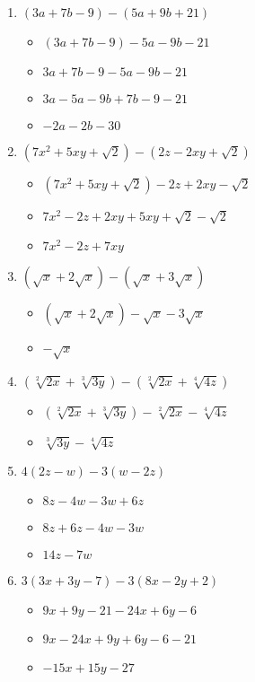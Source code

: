 \documentclass{article}
\begin{document}
\begin{onehalfspace}
\begin{enumerate}
    \item $(3a + 7b - 9) - (5a + 9b + 21)$
    \begin{itemize}
        \item $(3a + 7b - 9) - 5a - 9b - 21$
        \item $3a + 7b - 9 - 5a - 9b - 21$
        \item $3a - 5a - 9b + 7b - 9 - 21$
        \item $-2a - 2b - 30$
    \end{itemize}

    \item $(7x^{2} + 5xy + \sqrt{2}) - (2z - 2xy + \sqrt{2})$
    \begin{itemize}
        \item $(7x^{2} + 5xy + \sqrt{2}) - 2z + 2xy - \sqrt{2}$
        \item $7x^{2} - 2z + 2xy + 5xy + \sqrt{2} - \sqrt{2}$
        \item $7x^{2} - 2z + 7xy$
    \end{itemize}

    \item $(\sqrt{x} + 2\sqrt{x}) - (\sqrt{x} + 3\sqrt{x})$
    \begin{itemize}
        \item $(\sqrt{x} + 2\sqrt{x}) - \sqrt{x} - 3\sqrt{x}$
        \item $- \sqrt{x}$
    \end{itemize}

    \item $(\sqrt[2]{2x} + \sqrt[3]{3y}) - (\sqrt[2]{2x} + \sqrt[4]{4z})$
    \begin{itemize}
        \item $(\sqrt[2]{2x} + \sqrt[3]{3y}) - \sqrt[2]{2x} - \sqrt[4]{4z}$
        \item $\sqrt[3]{3y} - \sqrt[4]{4z}$
    \end{itemize}

    \item $4(2z - w) - 3(w - 2z)$
    \begin{itemize}
        \item $8z - 4w - 3w + 6z$
        \item $8z + 6z - 4w - 3w$
        \item $14z - 7w$
    \end{itemize}

    \item $3(3x + 3y - 7) - 3(8x - 2y + 2)$
    \begin{itemize}
        \item $9x + 9y - 21 - 24x + 6y - 6$
        \item $9x - 24x + 9y + 6y - 6 - 21$
        \item $-15x + 15y - 27$
    \end{itemize}


\end{enumerate}
\end{onehalfspace}
\end{document}
